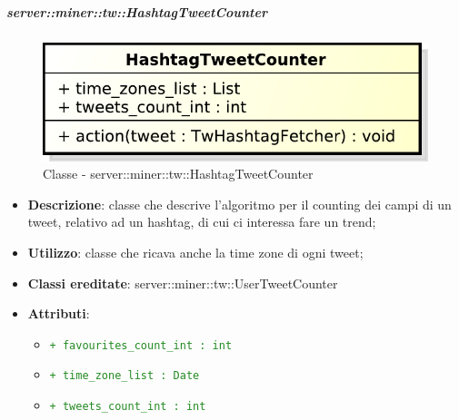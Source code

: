 	\subparagraph{server::miner::tw::HashtagTweetCounter} %
		\label{subp:server_miner_tw_HashtagTweetCounter}
		    \begin{figure}[!htbp]
 		 		\centering
 				\centerline{\includegraphics[scale=0.75]{./images/server/classes/miner/hashtag_tweet_counter.pdf}}
 				\caption{Classe - server::miner::tw::HashtagTweetCounter}
			\end{figure}
			\begin{itemize}
				\item \textbf{Descrizione}: classe che descrive l'algoritmo per il counting dei campi di un tweet, relativo ad un hashtag, di cui ci interessa fare un trend;
				\item \textbf{Utilizzo}: classe che ricava anche la time zone di ogni tweet;
				\item \textbf{Classi ereditate}: server::miner::tw::UserTweetCounter
				\item \textbf{Attributi}:    
					\begin{itemize}
						\item \textcolor{forestgreen}{\texttt{+ favourites\_count\_int : int}}
						\item \textcolor{forestgreen}{\texttt{+ time\_zone\_list : Date}}
						\item \textcolor{forestgreen}{\texttt{+ tweets\_count\_int : int}}
\end{itemize}
\end{itemize}
